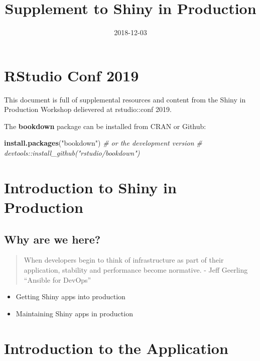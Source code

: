 \documentclass[]{book}
\title{Supplement to Shiny in Production}
\author{}
\date{2018-12-03}
\newenvironment{Shaded}{\begin{snugshade}}{\end{snugshade}}
\newcommand{\CommentTok}[1]{\textcolor[rgb]{0.56,0.35,0.01}{\textit{#1}}}
\newcommand{\KeywordTok}[1]{\textcolor[rgb]{0.13,0.29,0.53}{\textbf{#1}}}
\newcommand{\NormalTok}[1]{#1}
\newcommand{\StringTok}[1]{\textcolor[rgb]{0.31,0.60,0.02}{#1}}
\providecommand{\tightlist}{%
  \setlength{\itemsep}{0pt}\setlength{\parskip}{0pt}}
\begin{document}
\maketitle

{
\setcounter{tocdepth}{1}
\tableofcontents
}
\hypertarget{rstudio-conf-2019}{%
\chapter{RStudio Conf 2019}\label{rstudio-conf-2019}}

This document is full of supplemental resources and content from the
Shiny in Production Workshop delievered at rstudio::conf 2019.

The \textbf{bookdown} package can be installed from CRAN or Github:

\begin{Shaded}
\begin{Highlighting}[]
\KeywordTok{install.packages}\NormalTok{(}\StringTok{"bookdown"}\NormalTok{)}
\CommentTok{# or the development version}
\CommentTok{# devtools::install_github("rstudio/bookdown")}
\end{Highlighting}
\end{Shaded}

\hypertarget{course-intro}{%
\chapter{Introduction to Shiny in Production}\label{course-intro}}

\hypertarget{why-are-we-here}{%
\section{Why are we here?}\label{why-are-we-here}}

\begin{quote}
When developers begin to think of infrastructure as part of their
application, stability and performance become normative. - Jeff Geerling
``Ansible for DevOps''
\end{quote}

\begin{itemize}
\tightlist
\item
  Getting Shiny apps into production
\item
  Maintaining Shiny apps in production
\end{itemize}

\hypertarget{app-intro}{%
\chapter{Introduction to the Application}\label{app-intro}}
\end{document}
